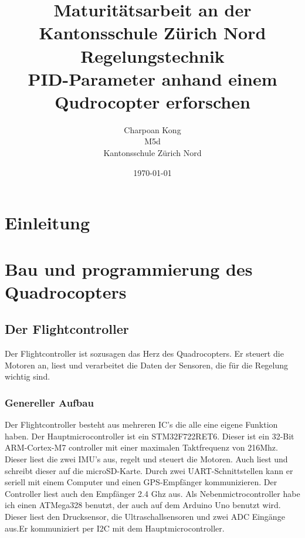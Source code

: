 \documentclass[12pt,a4paper, ngerman]{article}
\begin{document}

\title{\large Maturitätsarbeit an der Kantonsschule Zürich Nord \\ \Huge Regelungstechnik \\ \huge PID-Parameter anhand einem Qudrocopter erforschen}
\date{\today}
\author{Charpoan Kong \\ M5d \\ Kantonsschule Zürich Nord}
\maketitle
{}

\newpage
\clearpage
{}
\tableofcontents
\newpage
{}

\section{Einleitung}

\newpage
\section{Bau und programmierung des Quadrocopters}
\subsection{Der Flightcontroller}
Der Flightcontroller ist sozusagen das Herz des Quadrocopters. Er steuert die Motoren an, liest und verarbeitet die Daten der Sensoren, die für die Regelung wichtig sind.
\subsubsection{Genereller Aufbau}
Der Flightcontroller besteht aus mehreren IC's die alle eine eigene Funktion haben. Der Hauptmicrocontroller ist ein STM32F722RET6. Dieser ist ein 32-Bit ARM-Cortex-M7 controller mit einer maximalen Taktfrequenz von 216Mhz. Dieser liest die zwei IMU's aus, regelt und steuert die Motoren. Auch liest und schreibt dieser auf die microSD-Karte. Durch zwei UART-Schnittstellen kann er seriell mit einem Computer und einen GPS-Empfänger kommunizieren. Der Controller liest auch den Empfänger 2.4 Ghz aus. Als Nebenmictrocontroller habe ich einen ATMega328 benutzt, der auch auf dem Arduino Uno benutzt wird. Dieser liest den Drucksensor, die Ultraschallsensoren und zwei ADC Eingänge aus.Er kommuniziert per I2C mit dem Hauptmicrocontroller.
\end{document}
